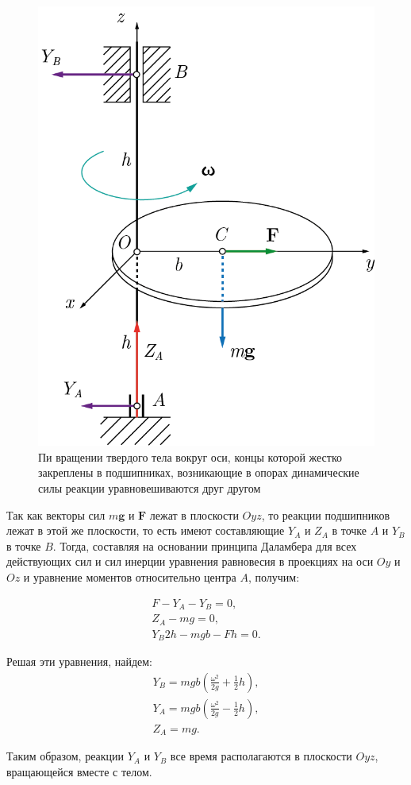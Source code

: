 \documentclass[14pt,a4paper,oneside]{extarticle}	%
\begin{document}
\begin{figure}[H] 	
	\centering 		
	\includegraphics[width=0.5\linewidth]{freeaxis-5.png}
	\caption{Пи вращении твердого тела вокруг оси, концы которой жестко закреплены в подшипниках, возникающие в опорах динамические силы реакции уравновешиваются друг другом}
	\label{freeaxis-5}
\end{figure}

Так как векторы сил $ m\textbf{g} $ и $ \textbf{F} $ лежат в плоскости $ Oyz $, то реакции подшипников лежат в этой же плоскости, то есть имеют составляющие $ Y_{A} $ и $ Z_{A} $ в точке $ A $ и $ Y_{B} $ в точке $ B $. 
Тогда, составляя на основании принципа Даламбера для всех действующих сил и сил инерции уравнения равновесия в проекциях на оси $ Oy $ и $ Oz $ и уравнение моментов относительно центра $ A $, получим:

\begin{eqnarray}\label{freeaxis-eq1}
F -  Y_{A} -  Y_{B} = 0, \\
Z_{A} - mg = 0,\\
Y_{B}2h - mgb-Fh=0.
\end{eqnarray}

Решая эти уравнения, найдем:
\begin{eqnarray}\label{freeaxis-eq2}
Y_{B} = mgb\left(\frac{\omega^{2}}{2g} + \frac{1}{2}h\right), \\
Y_{A} = mgb\left(\frac{\omega^{2}}{2g} - \frac{1}{2}h\right),\\
Z_{A} = mg.
\end{eqnarray}

Таким образом, реакции $ Y_{A} $ и $ Y_{B} $ все время располагаются в плоскости $ Oyz $, вращающейся вместе с телом.
\end{document}
